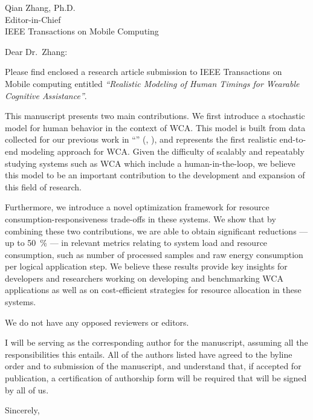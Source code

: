 \documentclass[10pt, letterpaper]{letter}
\begin{document}
\begin{letter}{
    Qian Zhang, Ph.D.\\
    Editor-in-Chief\\
    IEEE Transactions on Mobile Computing
}
\opening{Dear Dr.\ Zhang:}

Please find enclosed a research article submission to IEEE Transactions on Mobile computing entitled \emph{``Realistic Modeling of Human Timings for Wearable Cognitive Assistance''}.

This manuscript presents two main contributions.
We first introduce a stochastic model for human behavior in the context of \ac{WCA}.
This model is built from data collected for our previous work in ``'' (\citeauthor{olguinmunoz:impact2021}, ), and represents the first realistic end-to-end modeling approach for \ac{WCA}.
Given the difficulty of scalably and repeatably studying systems such as \ac{WCA} which include a human-in-the-loop, we believe this model to be an important contribution to the development and expansion of this field of research.

Furthermore, we introduce a novel optimization framework for resource consumption-responsiveness trade-offs in these systems.
We show that by combining these two contributions, we are able to obtain significant reductions --- up to \SI{50}{\percent} --- in relevant metrics relating to system load and resource consumption, such as number of processed samples and raw energy consumption per logical application step.
We believe these results provide key insights for developers and researchers working on developing and benchmarking \ac{WCA} applications as well as on cost-efficient strategies for resource allocation in these systems.

We do not have any opposed reviewers or editors.

I will be serving as the corresponding author for the manuscript, assuming all the responsibilities this entails. 
All of the authors listed have agreed to the byline order and to submission of the manuscript, and understand that, if accepted for publication, a certification of authorship form will be required that will be signed by all of us.

\closing{Sincerely,}
\end{letter}
\end{document}
